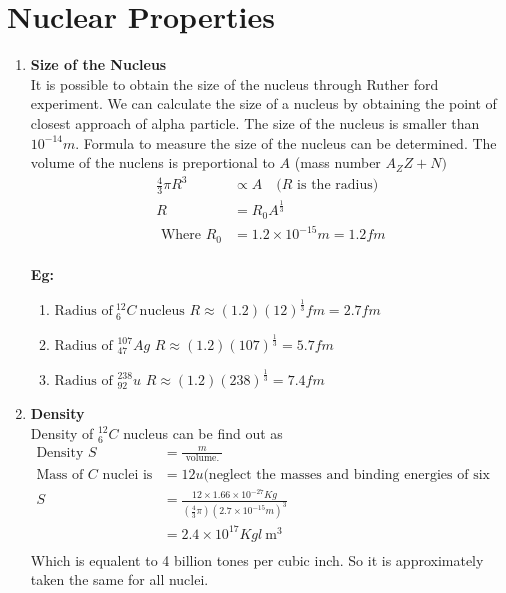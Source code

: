 \section{Nuclear Properties}
\begin{enumerate}
	\item \textbf{Size of the Nucleus}\\
It is possible to obtain the size of the nucleus through Ruther ford experiment. We can calculate the size of a nucleus by obtaining the point of closest approach of alpha particle. The size of the nucleus is smaller than $10^{-14}m$. Formula to measure the size of the nucleus can be determined. The volume of the nuclens is preportional to  $A$ (mass number $A_Z Z+N)$\\
\begin{align*}
\frac{4}{3}\pi R^3&\propto A\quad\text{($R$ is the radius) }\\
R&=R_0 A^\frac{1}{3}\\
\text{ Where }R_0&= 1.2\times 10^{-15}m=1.2 fm
\end{align*}
\\
\textbf{Eg:}
\begin{enumerate}
	\item $ \text{Radius of}\ ^{12}_6 C\  \text{nucleus}$
$R\approx(1.2)(12)^\frac{1}{3}fm=2.7fm$
\item $ \text{Radius of }^{107}_{47}Ag$
$R\approx(1.2)(107)^\frac{1}{3}=5.7fm$
 \item $ \text{Radius of }^{238}_{92}u$
$R\approx(1.2)(238)^\frac{1}{3}=7.4fm$
\end{enumerate}
\item \textbf{Density}\\
Density of $^{12}_6C$ nucleus can be find out as \\
\begin{align*}
\text{Density }S&=\frac{m}{\text { volume. }}\\
\text{Mass of $C$ nuclei is }&=12 u\text{(neglect the masses and binding energies of six electrons)}\\
S&=\frac{12\times1.66\times10^{-27}Kg}{\left(\frac{4}{3}\pi \right)\left(2.7\times 10^{-15} m \right)^3  }\\
&=2.4 \times 10^{17} Kg l \mathrm{~m}^{3}\\
\end{align*}
Which is equalent to 4 billion tones per cubic inch. So it is approximately taken the same for all nuclei.\\
\begin{center}
	\framebox{
		\parbox[t][0.5cm]{3.5cm}{
			
}}
\end{center}
\end{enumerate}
